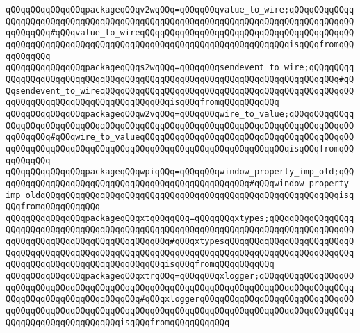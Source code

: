 \verb|qQQqqQQqqQQqqQQqpackageqQQqv2wqQQq=qQQqqQQqvalue_to_wire;qQQqqQQqqQQqqQQqqQQqqQQqqQQqqQQqqQQqqQQqqQQqqQQqqQQqqQQqqQQqqQQqqQQqqQQqqQQqqQQqqQQqqQQqqQQq#qQQqvalue_to_wireqQQqqQQqqQQqqQQqqQQqqQQqqQQqqQQqqQQqqQQqqQQqqQQqqQQqqQQqqQQqqQQqqQQqqQQqqQQqqQQqqQQqqQQqqQQqqQQqqQQqisqQQqfromqQQqqQQqqQQq|\newline
\verb|qQQqqQQqqQQqqQQqpackageqQQqs2wqQQq=qQQqqQQqsendevent_to_wire;qQQqqQQqqQQqqQQqqQQqqQQqqQQqqQQqqQQqqQQqqQQqqQQqqQQqqQQqqQQqqQQqqQQqqQQqqQQq#qQQqsendevent_to_wireqQQqqQQqqQQqqQQqqQQqqQQqqQQqqQQqqQQqqQQqqQQqqQQqqQQqqQQqqQQqqQQqqQQqqQQqqQQqqQQqqQQqisqQQqfromqQQqqQQqqQQq|\newline
\verb|qQQqqQQqqQQqqQQqpackageqQQqw2vqQQq=qQQqqQQqwire_to_value;qQQqqQQqqQQqqQQqqQQqqQQqqQQqqQQqqQQqqQQqqQQqqQQqqQQqqQQqqQQqqQQqqQQqqQQqqQQqqQQqqQQqqQQqqQQq#qQQqwire_to_valueqQQqqQQqqQQqqQQqqQQqqQQqqQQqqQQqqQQqqQQqqQQqqQQqqQQqqQQqqQQqqQQqqQQqqQQqqQQqqQQqqQQqqQQqqQQqqQQqqQQqisqQQqfromqQQqqQQqqQQq|\newline
\verb|qQQqqQQqqQQqqQQqpackageqQQqwpiqQQq=qQQqqQQqwindow_property_imp_old;qQQqqQQqqQQqqQQqqQQqqQQqqQQqqQQqqQQqqQQqqQQqqQQqqQQq#qQQqwindow_property_imp_oldqQQqqQQqqQQqqQQqqQQqqQQqqQQqqQQqqQQqqQQqqQQqqQQqqQQqqQQqqQQqisqQQqfromqQQqqQQqqQQq|\newline
\verb|qQQqqQQqqQQqqQQqpackageqQQqxtqQQqqQQq=qQQqqQQqxtypes;qQQqqQQqqQQqqQQqqQQqqQQqqQQqqQQqqQQqqQQqqQQqqQQqqQQqqQQqqQQqqQQqqQQqqQQqqQQqqQQqqQQqqQQqqQQqqQQqqQQqqQQqqQQqqQQqqQQqqQQq#qQQqxtypesqQQqqQQqqQQqqQQqqQQqqQQqqQQqqQQqqQQqqQQqqQQqqQQqqQQqqQQqqQQqqQQqqQQqqQQqqQQqqQQqqQQqqQQqqQQqqQQqqQQqqQQqqQQqqQQqqQQqqQQqqQQqqQQqisqQQqfromqQQqqQQqqQQq|\newline
\verb|qQQqqQQqqQQqqQQqpackageqQQqxtrqQQq=qQQqqQQqxlogger;qQQqqQQqqQQqqQQqqQQqqQQqqQQqqQQqqQQqqQQqqQQqqQQqqQQqqQQqqQQqqQQqqQQqqQQqqQQqqQQqqQQqqQQqqQQqqQQqqQQqqQQqqQQqqQQqqQQq#qQQqxloggerqQQqqQQqqQQqqQQqqQQqqQQqqQQqqQQqqQQqqQQqqQQqqQQqqQQqqQQqqQQqqQQqqQQqqQQqqQQqqQQqqQQqqQQqqQQqqQQqqQQqqQQqqQQqqQQqqQQqqQQqqQQqisqQQqfromqQQqqQQqqQQq|\newline
